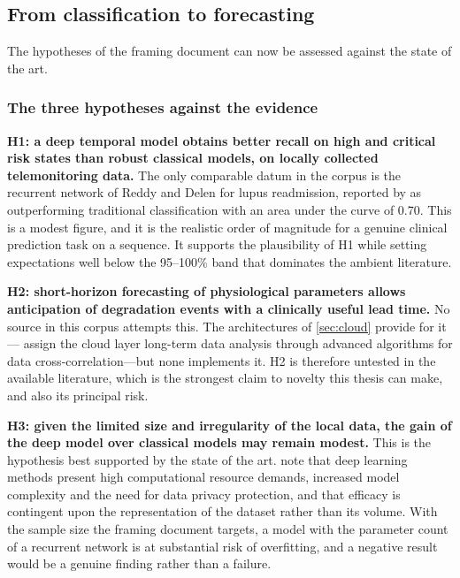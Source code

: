 \documentclass[12pt,a4paper,oneside]{report}
\begin{document}
\subsection{From classification to forecasting}\label{sec:forecasting}

The hypotheses of the framing document can now be assessed against the state of the art.

\subsubsection{The three hypotheses against the evidence}

\textbf{H1: a deep temporal model obtains better recall on high and critical risk states than robust classical models, on locally collected telemonitoring data.} The only comparable datum in the corpus is the recurrent network of Reddy and Delen for lupus readmission, reported by \textcite{liu2025review} as outperforming traditional classification with an area under the curve of 0.70. This is a modest figure, and it is the realistic order of magnitude for a genuine clinical prediction task on a sequence. It supports the plausibility of H1 while setting expectations well below the 95--100\% band that dominates the ambient literature.

\textbf{H2: short-horizon forecasting of physiological parameters allows anticipation of degradation events with a clinically useful lead time.} No source in this corpus attempts this. The architectures of \cref{sec:cloud} provide for it---\textcite{mucchi2021} assign the cloud layer long-term data analysis through advanced algorithms for data cross-correlation---but none implements it. H2 is therefore untested in the available literature, which is the strongest claim to novelty this thesis can make, and also its principal risk.

\textbf{H3: given the limited size and irregularity of the local data, the gain of the deep model over classical models may remain modest.} This is the hypothesis best supported by the state of the art. \Textcite{liu2025review} note that deep learning methods present high computational resource demands, increased model complexity and the need for data privacy protection, and that efficacy is contingent upon the representation of the dataset rather than its volume. With the sample size the framing document targets, a model with the parameter count of a recurrent network is at substantial risk of overfitting, and a negative result would be a genuine finding rather than a failure.
\end{document}
